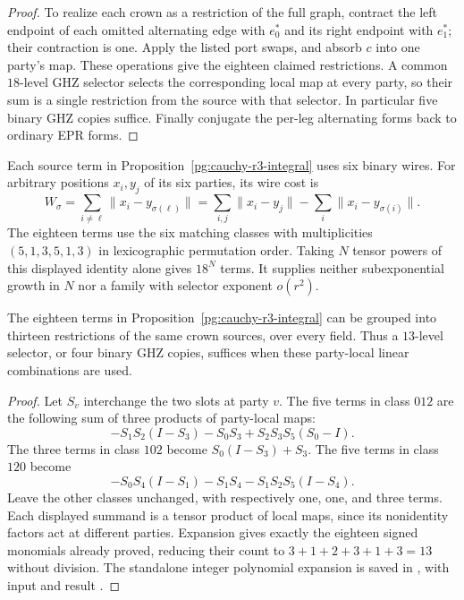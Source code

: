 \begin{proof}
To realize each crown as a restriction of the full graph, contract the left
endpoint of each omitted alternating edge with $e_0^*$ and its right endpoint
with $e_1^*$; their contraction is one. Apply the listed port swaps, and
absorb $c$ into one party's map. These operations give the eighteen claimed
restrictions. A common $18$-level GHZ selector selects the corresponding
local map at every party, so their sum is a single restriction from the
source with that selector. In particular five binary GHZ copies suffice.
Finally conjugate the per-leg alternating forms back to ordinary EPR forms.
\end{proof}

Each source term in Proposition~\ref{pg:cauchy-r3-integral} uses six binary
wires. For arbitrary positions $x_i,y_j$ of its six parties, its wire cost is
\[
 W_\sigma=\sum_{i\ne\ell}\|x_i-y_{\sigma(\ell)}\|
 =\sum_{i,j}\|x_i-y_j\|-\sum_i\|x_i-y_{\sigma(i)}\|.
\]
The eighteen terms use the six matching classes with multiplicities
$(5,1,3,5,1,3)$ in lexicographic permutation order. Taking $N$ tensor powers
of this displayed identity alone gives $18^N$ terms. It supplies neither
subexponential growth in $N$ nor a family with selector exponent $o(r^2)$.

\begin{corollary}
\label{pg:cauchy-r3-dense}
The eighteen terms in Proposition~\ref{pg:cauchy-r3-integral} can be grouped
into thirteen restrictions of the same crown sources, over every field.
Thus a $13$-level selector, or four binary GHZ copies, suffices when these
party-local linear combinations are used.
\end{corollary}
\begin{proof}
Let $S_v$ interchange the two slots at party $v$. The five terms in class
$012$ are the following sum of three products of party-local maps:
\[
 -S_1S_2(I-S_3)-S_0S_3+S_2S_3S_5(S_0-I).
\]
The three terms in class $102$ become
$S_0(I-S_3)+S_3$. The five terms in class $120$ become
\[
 -S_0S_4(I-S_1)-S_1S_4-S_1S_2S_5(I-S_4).
\]
Leave the other classes unchanged, with respectively one, one, and three
terms. Each displayed summand is a tensor product of local maps, since
its nonidentity factors act at different parties. Expansion gives exactly
the eighteen signed monomials already proved, reducing their count to
$3+1+2+3+1+3=13$ without division. The standalone integer polynomial
expansion is saved in , with
input  and result
.
\end{proof}

